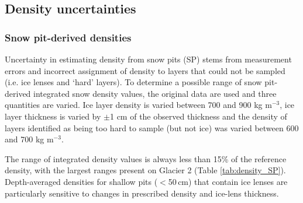 \documentclass{sfuthesis}
\begin{document}
\subsection{Density uncertainties}

\subsubsection{Snow pit-derived densities}

Uncertainty in estimating density from snow pits (SP) stems from measurement errors and incorrect assignment of density to layers that could not be sampled (i.e. ice lenses and `hard' layers). To determine a possible range of snow pit-derived integrated snow density values, the original data are used and three quantities are varied. Ice layer density is varied between 700 and 900 kg m$^{-3}$, ice layer thickness is varied by $\pm$1 cm of the observed thickness and the density of layers identified as being too hard to sample (but not ice) was varied between 600 and 700 kg m$^{-3}$. 

The range of integrated density values is always less than 15\% of the reference density, with the largest ranges present on Glacier 2 (Table \ref{tab:density_SP}). Depth-averaged densities for shallow pits ($<$50\,cm) that contain ice lenses are particularly sensitive to changes in prescribed density and ice-lens thickness.
\end{document}
